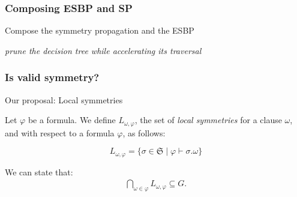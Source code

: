 \documentclass{beamer}
\begin{document}
\begin{frame}
\frametitle{Composing ESBP and SP}


Compose the symmetry propagation and the ESBP\\
\begin{center}
	\textit{prune the decision tree while accelerating its traversal}
\end{center}

\vfill
{}

\end{frame}


\begin{frame}
	\frametitle{Is valid symmetry?}
	\newcommand{\symm}[0]{\ensuremath{\mathfrak{S}}}
	Our proposal: Local symmetries
	
	
	
	\vfill
	
	\begin{block}{}
		Let $\varphi$ be a formula. We define $L_{\omega,\varphi}$,
		the set of \textit{local symmetries} for a clause $\omega$, and with respect to
		a formula $\varphi$, as follows:
		
		$$L_{\omega,\varphi}=\{\sigma \in \symm \mid \varphi \vdash \sigma.\omega\}$$
	\end{block}
	
		\vfill
		We can state that:
		\begin{align*}
		\underset{\omega \in \varphi}{\bigcap}L_{\omega,\varphi} \subseteq G. %
		\end{align*}
	
\end{frame}
\end{document}
